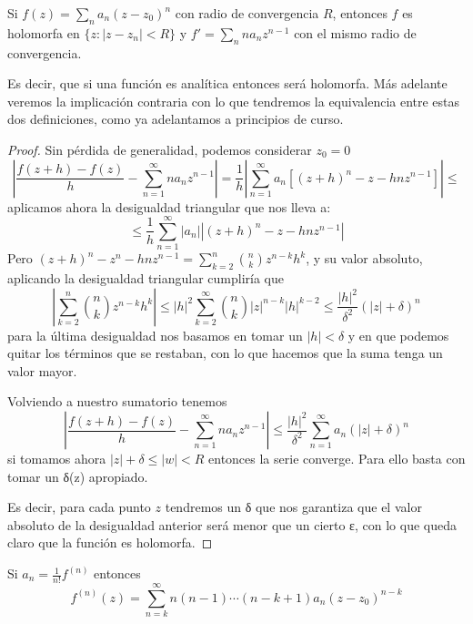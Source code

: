 \documentclass{apuntes}
\begin{document}
\begin{prop}
Si $f(z)=\sum_n a_n(z-z_0)^n$ con radio de convergencia $R$, entonces $f$ es holomorfa en $\{z: |z-z_n|<R\}$ y $f'=\sum_n n a_n z^{n-1}$ con el mismo radio de convergencia.

Es decir, que si una función es analítica entonces será holomorfa. Más adelante veremos la implicación contraria con lo que tendremos la equivalencia entre estas dos definiciones, como ya adelantamos a principios de curso.
\end{prop}
\begin{proof}
Sin pérdida de generalidad, podemos considerar $z_0 = 0$
\[\left|\frac{f(z+h)-f(z)}{h}- \sum_{n=1}^{\infty}na_nz^{n-1}\right|=\frac{1}{h}\left|\sum_{n=1}^{\infty} a_n \left[(z+h)^n-z-hnz^{n-1}\right] \right| \leq\]
aplicamos ahora la desigualdad triangular que nos lleva a:
\[\leq \frac{1}{h} \sum_{n=1}^{\infty}|a_n|\left| (z+h)^n-z-hnz^{n-1} \right |\]
Pero $(z+h)^n -z^n-hnz^{n-1} = \sum_{k=2}^{n}{n \choose k} z^{n-k}h^k$, y su valor absoluto, aplicando la desigualdad triangular cumpliría que
\[\left|\sum_{k=2}^{n}{n \choose k} z^{n-k}h^k \right| \leq |h|^2 \sum_{k=2}^{\infty}{n \choose k}|z|^{n-k}|h|^{k-2} \leq \frac{|h|^2}{δ^2} \left( |z| + δ\right)^n\]
para la última desigualdad nos basamos en tomar un $|h|<δ$ y en que podemos quitar los términos que se restaban, con lo que hacemos que la suma tenga un valor mayor.

Volviendo a nuestro sumatorio tenemos
\[\left|\frac{f(z+h)-f(z)}{h}- \sum_{n=1}^{\infty}na_nz^{n-1}\right| \leq  \frac{|h|^2}{δ^2} \sum_{n=1}^{\infty} a_n\left( |z| + δ\right)^n\]
si tomamos ahora $|z|+δ \leq |w| < R$ entonces la serie converge. Para ello basta con tomar un δ(z) apropiado.

Es decir, para cada punto $z$ tendremos un δ que nos garantiza que el valor absoluto de la desigualdad anterior será menor que un cierto ε, con lo que queda claro que la función es holomorfa.

\end{proof}

\obs Si $a_n = \frac{1}{n!}f^{(n)}$ entonces
\[f^{(n)}(z)=\sum_{n=k}^{\infty}n(n-1)\cdots (n-k+1)a_n(z-z_0)^{n-k}\]
\end{document}
